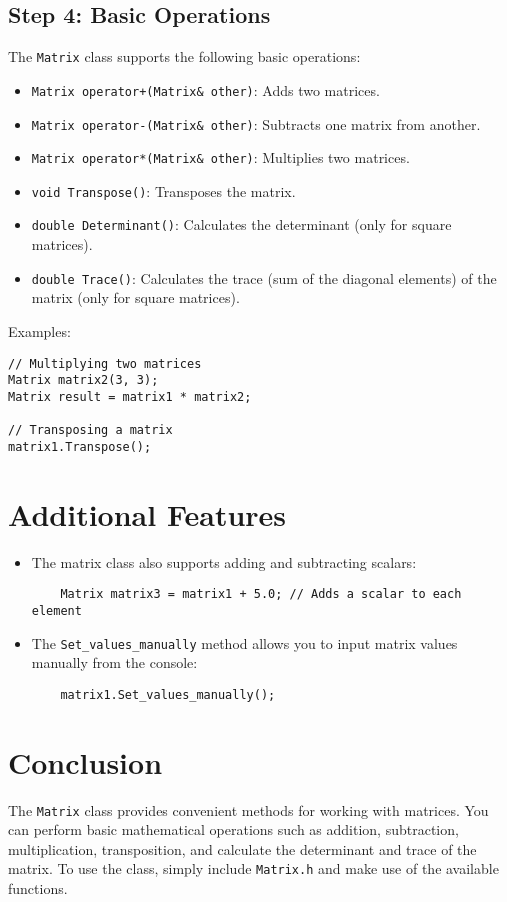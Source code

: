 \documentclass{article}
\begin{document}
\subsection{Step 4: Basic Operations}
The \texttt{Matrix} class supports the following basic operations:

\begin{itemize}
    \item \texttt{Matrix operator+(Matrix\& other)}: Adds two matrices.
    \item \texttt{Matrix operator-(Matrix\& other)}: Subtracts one matrix from another.
    \item \texttt{Matrix operator*(Matrix\& other)}: Multiplies two matrices.
    \item \texttt{void Transpose()}: Transposes the matrix.
    \item \texttt{double Determinant()}: Calculates the determinant (only for square matrices).
    \item \texttt{double Trace()}: Calculates the trace (sum of the diagonal elements) of the matrix (only for square matrices).
\end{itemize}

Examples:

\begin{verbatim}
// Multiplying two matrices
Matrix matrix2(3, 3);
Matrix result = matrix1 * matrix2;

// Transposing a matrix
matrix1.Transpose();
\end{verbatim}

\section{Additional Features}
\begin{itemize}
    \item The matrix class also supports adding and subtracting scalars:
    \begin{verbatim}
    Matrix matrix3 = matrix1 + 5.0; // Adds a scalar to each element
    \end{verbatim}
    \item The \texttt{Set\_values\_manually} method allows you to input matrix values manually from the console:
    \begin{verbatim}
    matrix1.Set_values_manually();
    \end{verbatim}
\end{itemize}

\section{Conclusion}
The \texttt{Matrix} class provides convenient methods for working with matrices. You can perform basic mathematical operations such as addition, subtraction, multiplication, transposition, and calculate the determinant and trace of the matrix. To use the class, simply include \texttt{Matrix.h} and make use of the available functions.
\end{document}
